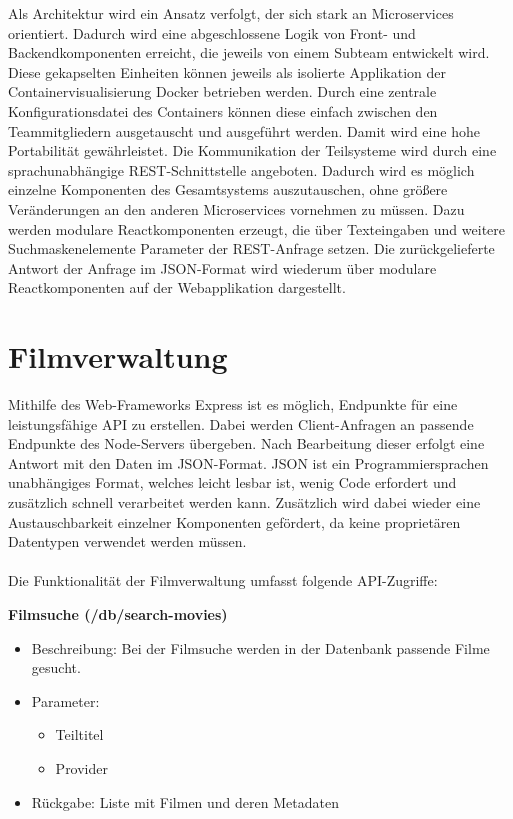 \documentclass[conference]{IEEEtran}
\begin{document}
Als Architektur wird ein Ansatz verfolgt, der sich stark an Microservices orientiert.
Dadurch wird eine abgeschlossene Logik von Front- und Backendkomponenten erreicht, die jeweils
von einem Subteam entwickelt wird. Diese gekapselten Einheiten können jeweils als isolierte Applikation der Containervisualisierung
Docker betrieben werden. Durch eine zentrale Konfigurationsdatei des Containers können diese einfach zwischen den Teammitgliedern
ausgetauscht und ausgeführt werden. Damit wird eine hohe Portabilität gewährleistet.
Die Kommunikation der Teilsysteme wird durch eine sprachunabhängige REST-Schnittstelle angeboten. 
Dadurch wird es möglich einzelne Komponenten des Gesamtsystems auszutauschen, ohne größere Veränderungen an den anderen 
Microservices vornehmen zu müssen.
Dazu werden modulare Reactkomponenten erzeugt, die über Texteingaben und weitere Suchmaskenelemente Parameter der REST-Anfrage setzen.
Die zurückgelieferte Antwort der Anfrage im JSON-Format wird wiederum über modulare Reactkomponenten auf der Webapplikation dargestellt.\cite{microservices}

\section{Filmverwaltung}
Mithilfe des Web-Frameworks Express ist es möglich, Endpunkte für eine leistungsfähige API zu erstellen. Dabei
werden Client-Anfragen an passende Endpunkte des Node-Servers übergeben. Nach Bearbeitung dieser erfolgt eine Antwort
mit den Daten im JSON-Format. JSON ist ein Programmiersprachen unabhängiges Format, welches leicht lesbar ist, wenig Code erfordert
und zusätzlich schnell verarbeitet werden kann. Zusätzlich wird dabei wieder eine Austauschbarkeit einzelner Komponenten 
gefördert, da keine proprietären Datentypen verwendet werden müssen.
\\
\\
Die Funktionalität der Filmverwaltung umfasst folgende API-Zugriffe:
\smallskip

\textbf{Filmsuche (/db/search-movies)}
\begin{itemize}
\item Beschreibung:
    Bei der Filmsuche werden in der Datenbank passende Filme gesucht.
\item Parameter:
\begin{itemize}
    \item Teiltitel
    \item Provider
\end{itemize}
\item Rückgabe:
    Liste mit Filmen und deren Metadaten
\end{itemize}
\end{document}
